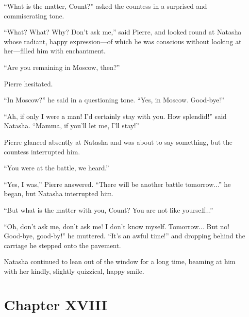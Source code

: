 ``What is the matter, Count?'' asked the countess in a surprised
and commiserating tone.

``What? What? Why? Don't ask me,'' said Pierre, and looked round
at Natasha whose radiant, happy expression---of which he was
conscious without looking at her---filled him with enchantment.

``Are you remaining in Moscow, then?''

Pierre hesitated.

``In Moscow?'' he said in a questioning tone. ``Yes, in
Moscow. Good-bye!''

``Ah, if only I were a man! I'd certainly stay with you. How
splendid!''  said Natasha. ``Mamma, if you'll let me, I'll
stay!''

Pierre glanced absently at Natasha and was about to say
something, but the countess interrupted him.

``You were at the battle, we heard.''

``Yes, I was,'' Pierre answered. ``There will be another battle
tomorrow...'' he began, but Natasha interrupted him.

``But what is the matter with you, Count? You are not like
yourself...''

``Oh, don't ask me, don't ask me! I don't know
myself. Tomorrow... But no! Good-bye, good-by!'' he
muttered. ``It's an awful time!'' and dropping behind the
carriage he stepped onto the pavement.

Natasha continued to lean out of the window for a long time,
beaming at him with her kindly, slightly quizzical, happy smile.


\chapter*{Chapter XVIII} \ifaudio {}
\fi

